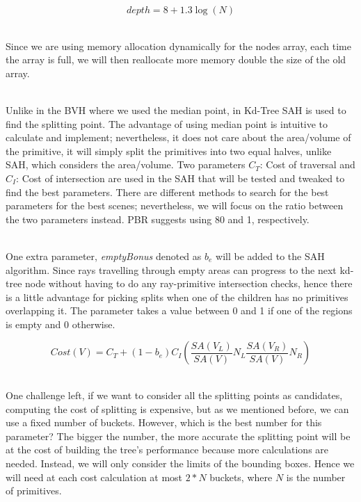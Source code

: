 \documentclass[11pt,a4paper]{article}
\begin{document}
\begin{equation}
depth = 8 + 1.3\log(N)
\label{eq:depth}
\end{equation}

\noindent
\\
Since we are using memory allocation dynamically for the nodes array, each time the array is full, we will then reallocate more memory double the size of the old array.

\noindent
\\
Unlike in the BVH where we used the median point, in Kd-Tree SAH is used to find the splitting point. The advantage of using median point is intuitive to calculate and implement; nevertheless, it does not care about the area/volume of the primitive, it will simply split the primitives into two equal halves, unlike SAH, which considers the area/volume. Two parameters $C_T$: Cost of traversal and $C_I$: Cost of intersection are used in the SAH that will be tested and tweaked to find the best parameters. There are different methods to search for the best parameters for the best scenes; nevertheless, we will focus on the ratio between the two parameters instead. PBR suggests using 80 and 1, respectively.


\noindent
\\
One extra parameter, \textit{emptyBonus} denoted as $b_e$ will be added to the SAH algorithm. Since rays travelling through empty areas can progress to the next kd-tree node without having to do any ray-primitive intersection checks, hence there is a little advantage for picking splits when one of the children has no primitives overlapping it. The parameter takes a value between 0 and 1 if one of the regions is empty and 0 otherwise. 


\begin{equation}
Cost(V) = C_T + (1-b_e)C_I(\frac{SA(V_L)}{SA(V)}N_L \frac{SA(V_R)}{SA(V)}N_R)
\end{equation}

\noindent
\\
One challenge left, if we want to consider all the splitting points as candidates, computing the cost of splitting is expensive, but as we mentioned before, we can use a fixed number of buckets. However, which is the best number for this parameter? The bigger the number, the more accurate the splitting point will be at the cost of building the tree's performance because more calculations are needed. Instead, we will only consider the limits of the bounding boxes. Hence we will need at each cost calculation at most $2 * N$ buckets, where $N$ is the number of primitives.
\end{document}
